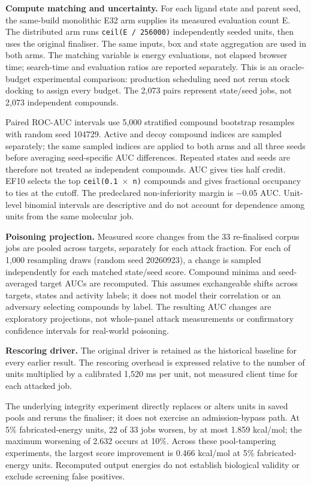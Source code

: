 \documentclass[11pt]{article}
\begin{document}
\textbf{Compute matching and uncertainty.} For each ligand state and parent seed, the same-build monolithic E32 arm supplies its measured evaluation count E. The distributed arm runs \texttt{ceil(E / 256000)} independently seeded units, then uses the original finaliser. The same inputs, box and state aggregation are used in both arms. The matching variable is energy evaluations, not elapsed browser time; search-time and evaluation ratios are reported separately. This is an oracle-budget experimental comparison: production scheduling need not rerun stock docking to assign every budget. The 2,073 pairs represent state/seed jobs, not 2,073 independent compounds.

Paired ROC-AUC intervals use 5,000 stratified compound bootstrap resamples with random seed 104729. Active and decoy compound indices are sampled separately; the same sampled indices are applied to both arms and all three seeds before averaging seed-specific AUC differences. Repeated states and seeds are therefore not treated as independent compounds. AUC gives ties half credit. EF10 selects the top \texttt{ceil(0.1 $\times$ n)} compounds and gives fractional occupancy to ties at the cutoff. The predeclared non-inferiority margin is $-$0.05 AUC. Unit-level binomial intervals are descriptive and do not account for dependence among units from the same molecular job.

\textbf{Poisoning projection.} Measured score changes from the 33 re-finalised corpus jobs are pooled across targets, separately for each attack fraction. For each of 1,000 resampling draws (random seed 20260923), a change is sampled independently for each matched state/seed score. Compound minima and seed-averaged target AUCs are recomputed. This assumes exchangeable shifts across targets, states and activity labels; it does not model their correlation or an adversary selecting compounds by label. The resulting AUC changes are exploratory projections, not whole-panel attack measurements or confirmatory confidence intervals for real-world poisoning.

\textbf{Rescoring driver.} The original driver is retained as the historical baseline for every earlier result. The rescoring overhead is expressed relative to the number of units multiplied by a calibrated 1,520 ms per unit, not measured client time for each attacked job.

The underlying integrity experiment directly replaces or alters units in saved pools and reruns the finaliser; it does not exercise an admission-bypass path. At 5\% fabricated-energy units, 22 of 33 jobs worsen, by at most 1.859 kcal/mol; the maximum worsening of 2.632 occurs at 10\%. Across these pool-tampering experiments, the largest score improvement is 0.466 kcal/mol at 5\% fabricated-energy units. Recomputed output energies do not establish biological validity or exclude screening false positives.
\end{document}
